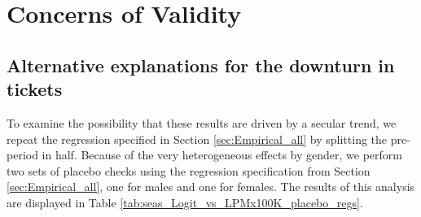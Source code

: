 \documentclass{cje}
\begin{document}
\section{Concerns of Validity}
\label{sec:Validity}


\subsection{Alternative explanations for the downturn in tickets}

To examine the possibility that these results are driven by a secular trend, 
we repeat the regression specified in 
Section \ref{sec:Empirical_all} 
by splitting the pre-period in half. 
Because of the very heterogeneous effects by gender, 
we perform two sets of placebo checks using the regression specification from 
Section \ref{sec:Empirical_all}, 
one for males and one for females. 
The results of this analysis are displayed in 
Table \ref{tab:seas_Logit_vs_LPMx100K_placebo_regs}. 
\end{document}

